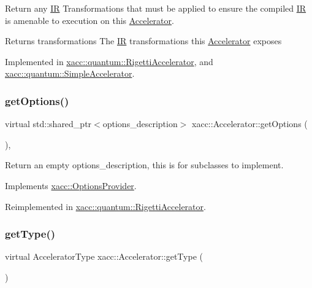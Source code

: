Return any \hyperlink{a01175}{IR} Transformations that must be applied to ensure the compiled \hyperlink{a01175}{IR} is amenable to execution on this \hyperlink{a01111}{Accelerator}.

\begin{DoxyReturn}{Returns}
transformations The \hyperlink{a01175}{IR} transformations this \hyperlink{a01111}{Accelerator} exposes 
\end{DoxyReturn}


Implemented in \hyperlink{a00939_a443683a1dfb000603c640b2ee303cf66}{xacc\+::quantum\+::\+Rigetti\+Accelerator}, and \hyperlink{a00959_afc49c9e7973ba6c6ff9761c36198323d}{xacc\+::quantum\+::\+Simple\+Accelerator}.

\mbox{\label{a01111_a98c9eda6b54367c75667ecfbbf167979}} 
\subsubsection{\texorpdfstring{get\+Options()}{getOptions()}}
{\footnotesize\ttfamily virtual std\+::shared\+\_\+ptr$<$options\+\_\+description$>$ xacc\+::\+Accelerator\+::get\+Options (\begin{DoxyParamCaption}{ }\end{DoxyParamCaption})\hspace{0.3cm}{\ttfamily [inline]}, {\ttfamily [virtual]}}

Return an empty options\+\_\+description, this is for subclasses to implement. 

Implements \hyperlink{a01219_a6d150954f852109bfe2c1ae90222926f}{xacc\+::\+Options\+Provider}.



Reimplemented in \hyperlink{a00939_a9ee9e62aecbccf193894ca3388676f9f}{xacc\+::quantum\+::\+Rigetti\+Accelerator}.

\mbox{\label{a01111_aaffc3e4bb9880eb5041b1b58ee4c2665}} 
\subsubsection{\texorpdfstring{get\+Type()}{getType()}}
{\footnotesize\ttfamily virtual Accelerator\+Type xacc\+::\+Accelerator\+::get\+Type (\begin{DoxyParamCaption}{ }\end{DoxyParamCaption})\hspace{0.3cm}{\ttfamily [pure virtual]}}

